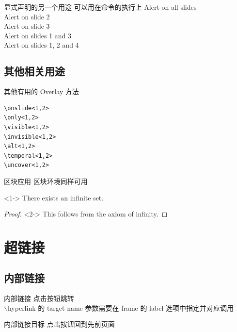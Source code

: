 \documentclass[UTF8,14pt,aspectratio=43,dvipsnames,svgnames,x11names,hyperref={urlcolor=blue}]{beamer}
\begin{document}
\begin{frame}{显式声明的另一个用途}
	可以用在命令的执行上  %
	\vskip12pt
	\alert{Alert on all slides}\\
	\alert<2>{Alert on slide 2}\\
	\alert<3>{Alert on slide 3}\\
	\alert<1,3>{Alert on slides 1 and 3}\\
	\alert<-2,4>{Alert on slides 1, 2 and 4}
\end{frame}

\subsection[其他相关用途]{其他相关用途}
\begin{frame}[fragile]{其他有用的 Overlay 方法}
	\begin{verbatim}
\onslide<1,2>
\only<1,2> 
\visible<1,2>
\invisible<1,2>
\alt<1,2> 
\temporal<1,2>
\uncover<1,2> 
\end{verbatim}
\end{frame}

\begin{frame}{区块应用}
	区块环境同样可用
	\begin{theorem}<1->
		There exists an infinite set.
	\end{theorem}
	\begin{proof}<2->
		This follows from the axiom of infinity.
	\end{proof}
\end{frame}

\section[超链接]{超链接}
\subsection[内部链接]{内部链接}
\begin{frame}[label=内部链接]{内部链接}
	点击按钮跳转 \hyperlink{内部链接目标}{}\\
	$\backslash$hyperlink 的 target name 参数需要在 frame 的 label 选项中指定并对应调用
\end{frame}

\begin{frame}[label=内部链接目标]{内部链接目标}
	点击按钮回到先前页面 \hyperlink{内部链接}{}
\end{frame}
\end{document}

